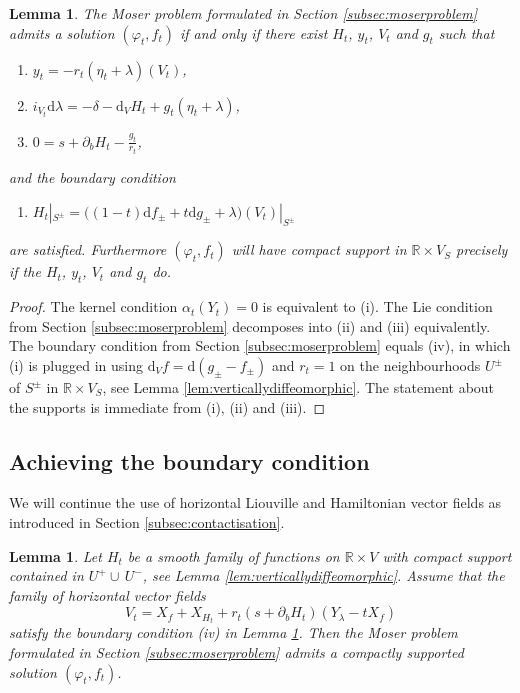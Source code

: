 \documentclass{amsart}
\newtheorem{lem}[prop]{Lemma}
\theoremstyle{definition}
\newcommand{\rmd}{\mathrm d}
\newcommand{\R}{\mathbb R}
\begin{document}
\begin{lem}
\label{lem:decompmosprob}
  The Moser problem
  formulated in Section \ref{subsec:moserproblem}
  admits a solution $(\varphi_t,f_t)$
  if and only if
  there exist $H_t$, $y_t$, $V_t$ and $g_t$ such that
  	\begin{enumerate}
 	\item[(i)]
	  $y_t=-r_t(\eta_t+\lambda)(V_t)$,
 	\item[(ii)]
	  $i_{V_t}\rmd\lambda=-\delta-\rmd_V\!H_t+g_t(\eta_t+\lambda)$,
 	\item[(iii)]
	  $0=s+\partial_bH_t-\frac{g_t}{r_t}$,
  	\end{enumerate}
 and the boundary condition
  	\begin{enumerate}
 	\item[(iv)]
	  $
	  H_t|_{S^{\pm}}=
	  \big((1-t)\rmd f_{\pm}+t\rmd g_{\pm}+\lambda\big)(V_t)|_{S^{\pm}}
	  $
  	\end{enumerate}
  are satisfied.
  Furthermore $(\varphi_t,f_t)$ will have
  compact support in $\R\times V_S$
  precisely if the $H_t$, $y_t$, $V_t$ and $g_t$ do.
\end{lem}


\begin{proof}
  The kernel condition $\alpha_t(Y_t)=0$ is equivalent to (i).
  The Lie condition from Section \ref{subsec:moserproblem}
  decomposes into (ii) and (iii) equivalently.
  The boundary condition from Section \ref{subsec:moserproblem}
  equals (iv), in which (i) is plugged in
  using $\rmd_V\!f=\rmd(g_{\pm}-f_{\pm})$ and $r_t=1$
  on the neighbourhoods $U^{\pm}$ of $S^{\pm}$
  in $\R\times V_S$,
  see Lemma \ref{lem:verticallydiffeomorphic}.
  The statement about the supports is immediate from (i), (ii) and (iii).
\end{proof}




\subsection{Achieving the boundary condition}
\label{subsec:achthebc}


We will continue the use 
of horizontal Liouville and Hamiltonian vector fields
as introduced in Section \ref{subsec:contactisation}.


\begin{lem}
\label{lem:intvecfield}
  Let $H_t$ be a smooth family of functions
  on $\R\times V$ with compact support
  contained in $U^+\cup\,U^-$,
  see Lemma \ref{lem:verticallydiffeomorphic}.
  Assume that the family of horizontal vector fields
  \[
    V_t=X_f+X_{H_t}+r_t(s+\partial_bH_t)(Y_{\lambda}-tX_f)
  \]
  satisfy the boundary condition (iv) in Lemma \ref{lem:decompmosprob}.
  Then the Moser problem formulated in Section \ref{subsec:moserproblem}
  admits a compactly supported solution $(\varphi_t,f_t)$.
\end{lem}
\end{document}
